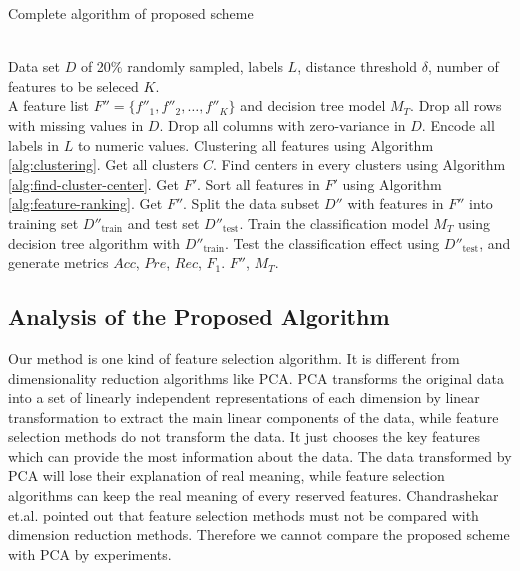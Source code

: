 \documentclass{ieeeaccess}
\theoremstyle{definition}
\begin{document}
\begin{algorithm}
    \caption{Complete algorithm of proposed scheme}
    \label{alg:complete-algorithm}
    \begin{algorithmic}[1]
        \REQUIRE ~~\\
            Data set $D$ of 20\% randomly sampled, labels $L$, distance threshold $\delta$, number of features to be seleced $K$.
        \ENSURE ~~\\
            A feature list $F''=\{f''_1, f''_2, \ldots, f''_K\}$ and decision tree model $M_T$.
        \STATE Drop all rows with missing values in $D$.
        \STATE Drop all columns with zero-variance in $D$.
        \STATE Encode all labels in $L$ to numeric values.
        \STATE Clustering all features using Algorithm \ref{alg:clustering}. Get all clusters $C$.
        \STATE Find centers in every clusters using Algorithm \ref{alg:find-cluster-center}. Get $F'$.
        \STATE Sort all features in $F'$ using Algorithm \ref{alg:feature-ranking}. Get $F''$.
        \STATE Split the data subset $D''$ with features in $F''$ into training set $D''_{\text{train}}$ and test set $D''_{\text{test}}$.
        \STATE Train the classification model $M_T$ using decision tree algorithm with $D''_{\text{train}}$.
        \STATE Test the classification effect using $D''_{\text{test}}$, and generate metrics $Acc$, $Pre$, $Rec$, $F_1$.
        \RETURN $F''$, $M_T$.
    \end{algorithmic}
\end{algorithm}

\subsection{Analysis of the Proposed Algorithm}

Our method is one kind of feature selection algorithm. It is different from dimensionality reduction algorithms like PCA\cite{PCA1987}. PCA transforms the original data into a set of linearly independent representations of each dimension by linear transformation to extract the main linear components of the data, while feature selection methods do not transform the data. It just chooses the key features which can provide the most information about the data. The data transformed by PCA will lose their explanation of real meaning, while feature selection algorithms can keep the real meaning of every reserved features. Chandrashekar et.al. \cite{Chandrashekar2014} pointed out that feature selection methods must not be compared with dimension reduction methods. Therefore we cannot compare the proposed scheme with PCA by experiments.
\end{document}
